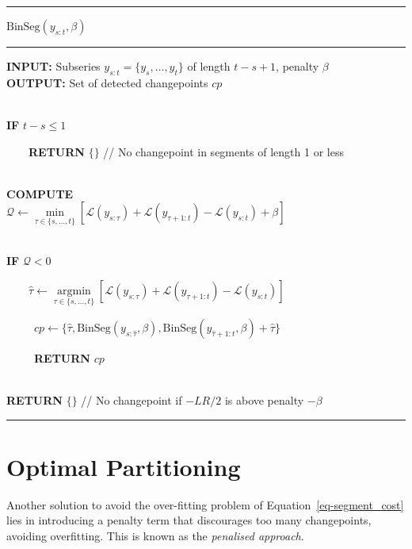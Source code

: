 \documentclass[
  letterpaper,
  DIV=11,
  numbers=noendperiod]{scrreprt}
\begin{document}
\begin{center}\rule{0.5\linewidth}{0.5pt}\end{center}

\(\text{BinSeg}(y_{s:t}, \beta)\)\\

\begin{center}\rule{0.5\linewidth}{0.5pt}\end{center}

\textbf{INPUT:} Subseries \(y_{s:t} = \{y_s, \dots, y_t\}\) of length
\(t - s + 1\), penalty \(\beta\)\\
\textbf{OUTPUT:} Set of detected changepoints \(cp\)\\
\strut \\
\textbf{IF} \(t - s \leq 1\)\\
\strut ~~~~\textbf{RETURN} \(\{\}\) // No changepoint in segments of
length 1 or less\\
\strut \\
\textbf{COMPUTE}\\
\(\mathcal{Q} \leftarrow \underset{\tau \in \{s, \dots, t\}}{\min} \left[ \mathcal{L}(y_{s:\tau}) + \mathcal{L}(y_{\tau+1:t}) - \mathcal{L}(y_{s:t}) + \beta \right]\)\\
\strut \\
\textbf{IF} \(\mathcal{Q} < 0\)\\
\strut ~~~~\(\hat{\tau} \leftarrow \underset{\tau \in \{s, \dots, t\}}{\text{arg}\min} \left[ \mathcal{L}(y_{s:\tau}) + \mathcal{L}(y_{\tau+1:t}) - \mathcal{L}(y_{s:t}) \right]\)\\
\strut ~~~~~\(cp \leftarrow \{ \hat{\tau}, \text{BinSeg}(y_{s:\hat{\tau}}, \beta), \text{BinSeg}(y_{\hat{\tau}+1:t}, \beta) + \hat\tau \}\)\\
\strut ~~~~~\textbf{RETURN} \(cp\)\\
\strut \\
\textbf{RETURN} \(\{\}\) // No changepoint if \(-LR/2\) is above penalty
\(- \beta\)

\begin{center}\rule{0.5\linewidth}{0.5pt}\end{center}

\section{Optimal Partitioning}\label{optimal-partitioning}

Another solution to avoid the over-fitting problem of
Equation~\ref{eq-segment_cost} lies in introducing a penalty term that
discourages too many changepoints, avoiding overfitting. This is known
as the \emph{penalised approach}.
\end{document}
